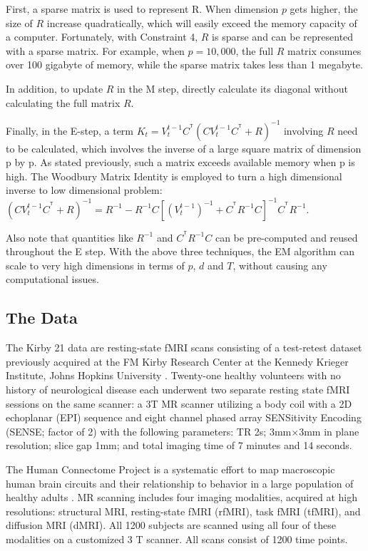 \documentclass[fleqn,12pt]{article}
\newcommand{\T}{^{\ensuremath{\mathsf{T}}}}           %
\begin{document}
First, a sparse matrix is used to represent R. When dimension $p$ gets higher, the size of $R$ increase quadratically, which will easily exceed the memory capacity of a computer.  Fortunately, with Constraint 4, $R$ is sparse and can be represented with a sparse matrix. For example, when $p=10,000$, the full $R$ matrix consumes over 100 gigabyte of memory, while the sparse matrix takes less than 1 megabyte.

In addition, to update $R$ in the M step, directly calculate its diagonal without calculating the full matrix $R$.

Finally, in the E-step, a term $K_t=V_t^{t-1}C^{\T}(CV_t^{t-1}C^{\T}+R)^{-1}$ involving $R$ need to be calculated, which involves the inverse of a large square matrix of dimension p by p. As stated previously, such a matrix exceeds available memory when p is high. The Woodbury Matrix Identity is employed to turn a high dimensional inverse to low dimensional problem: $(CV_t^{t-1}C^{\T}+R)^{-1} = R^{-1} - R^{-1}C[(V_t^{t-1})^{-1} + C^{\T}R^{-1}C]^{-1}C^{\T}R^{-1}$.

Also note that quantities like $R^{-1}$ and $C^{\T}R^{-1}C$ can be pre-computed and reused throughout the E step. With the above three techniques, the EM algorithm can scale to very high dimensions in terms of $p$, $d$ and $T$, without causing any computational issues.

\subsection{The Data}

The Kirby 21 data are resting-state fMRI scans consisting of a test-retest dataset previously acquired at the FM Kirby Research Center at the Kennedy Krieger Institute, Johns Hopkins University \citep{landman2011multi}. Twenty-one healthy volunteers with no history of neurological disease each underwent two separate resting state fMRI sessions on the same scanner: a 3T MR scanner utilizing a body coil with a 2D echoplanar (EPI) sequence and eight channel phased array SENSitivity Encoding (SENSE; factor of 2) with the following parameters: TR 2s; 3mm$\times$3mm in plane resolution; slice gap 1mm; and total imaging time of 7 minutes and 14 seconds.

The Human Connectome Project is a systematic effort to map macroscopic human brain circuits and their relationship to behavior in a large population of healthy adults \citep{van2013wu,moeller2010multiband,feinberg2010multiplexed}. MR scanning includes four imaging modalities, acquired at high resolutions: structural MRI, resting-state fMRI (rfMRI), task fMRI (tfMRI), and diffusion MRI (dMRI). All 1200 subjects are scanned using all four of these modalities on a customized 3 T scanner.  All scans consist of 1200 time points.
\end{document}
